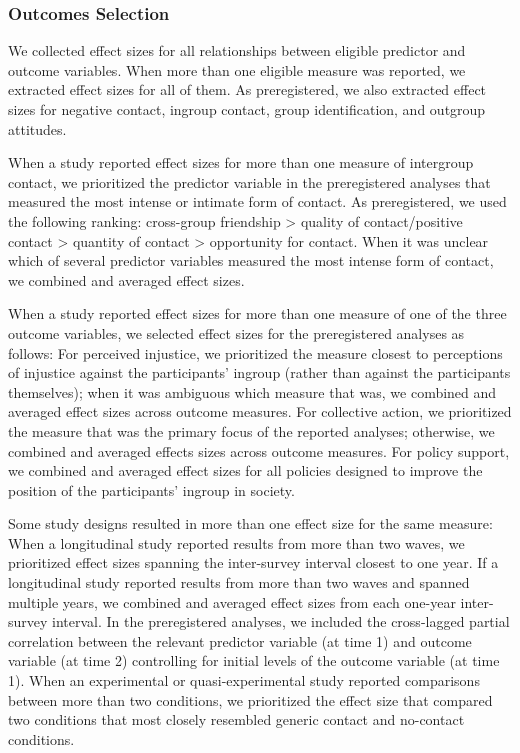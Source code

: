 \documentclass[twocolumn, 11pt, letterpaper]{article}
\begin{document}
\hypertarget{outcomes-selection}{%
\subsubsection{Outcomes Selection}\label{outcomes-selection}}

We collected effect sizes for all relationships between eligible
predictor and outcome variables. When more than one eligible measure was
reported, we extracted effect sizes for all of them. As preregistered,
we also extracted effect sizes for negative contact, ingroup contact,
group identification, and outgroup attitudes.

When a study reported effect sizes for more than one measure of
intergroup contact, we prioritized the predictor variable in the
preregistered analyses that measured the most intense or intimate form
of contact. As preregistered, we used the following ranking: cross-group
friendship \textgreater{} quality of contact/positive contact
\textgreater{} quantity of contact \textgreater{} opportunity for
contact. When it was unclear which of several predictor variables
measured the most intense form of contact, we combined and averaged
effect sizes.

When a study reported effect sizes for more than one measure of one of
the three outcome variables, we selected effect sizes for the
preregistered analyses as follows: For perceived injustice, we
prioritized the measure closest to perceptions of injustice against the
participants' ingroup (rather than against the participants themselves);
when it was ambiguous which measure that was, we combined and averaged
effect sizes across outcome measures. For collective action, we
prioritized the measure that was the primary focus of the reported
analyses; otherwise, we combined and averaged effects sizes across
outcome measures. For policy support, we combined and averaged effect
sizes for all policies designed to improve the position of the
participants' ingroup in society.

Some study designs resulted in more than one effect size for the same
measure: When a longitudinal study reported results from more than two
waves, we prioritized effect sizes spanning the inter-survey interval
closest to one year. If a longitudinal study reported results from more
than two waves and spanned multiple years, we combined and averaged
effect sizes from each one-year inter-survey interval. In the
preregistered analyses, we included the cross-lagged partial correlation
between the relevant predictor variable (at time 1) and outcome variable
(at time 2) controlling for initial levels of the outcome variable (at
time 1). When an experimental or quasi-experimental study reported
comparisons between more than two conditions, we prioritized the effect
size that compared two conditions that most closely resembled generic
contact and no-contact conditions.
\end{document}
